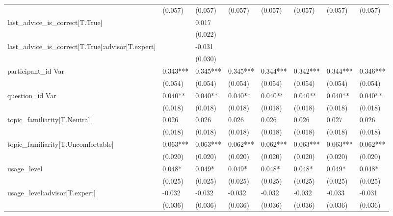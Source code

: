 \begin{table}
\begin{center}
\begin{tabular}{llllllll}
                                                    & (0.057)  & (0.057)  & (0.057)  & (0.057)  & (0.057)  & (0.057)  & (0.057)   \\
last\_advice\_is\_correct[T.True]                   &          & 0.017    &          &          &          &          &           \\
                                                    &          & (0.022)  &          &          &          &          &           \\
last\_advice\_is\_correct[T.True]:advisor[T.expert] &          & -0.031   &          &          &          &          &           \\
                                                    &          & (0.030)  &          &          &          &          &           \\
participant\_id Var                                 & 0.343*** & 0.345*** & 0.345*** & 0.344*** & 0.342*** & 0.344*** & 0.346***  \\
                                                    & (0.054)  & (0.054)  & (0.054)  & (0.054)  & (0.054)  & (0.054)  & (0.054)   \\
question\_id Var                                    & 0.040**  & 0.040**  & 0.040**  & 0.040**  & 0.040**  & 0.040**  & 0.040**   \\
                                                    & (0.018)  & (0.018)  & (0.018)  & (0.018)  & (0.018)  & (0.018)  & (0.018)   \\
topic\_familiarity[T.Neutral]                       & 0.026    & 0.026    & 0.026    & 0.026    & 0.026    & 0.027    & 0.026     \\
                                                    & (0.018)  & (0.018)  & (0.018)  & (0.018)  & (0.018)  & (0.018)  & (0.018)   \\
topic\_familiarity[T.Uncomfortable]                 & 0.063*** & 0.063*** & 0.062*** & 0.062*** & 0.063*** & 0.063*** & 0.062***  \\
                                                    & (0.020)  & (0.020)  & (0.020)  & (0.020)  & (0.020)  & (0.020)  & (0.020)   \\
usage\_level                                        & 0.048*   & 0.049*   & 0.049*   & 0.048*   & 0.048*   & 0.049*   & 0.048*    \\
                                                    & (0.025)  & (0.025)  & (0.025)  & (0.025)  & (0.025)  & (0.025)  & (0.025)   \\
usage\_level:advisor[T.expert]                      & -0.032   & -0.032   & -0.032   & -0.032   & -0.032   & -0.033   & -0.031    \\
                                                    & (0.036)  & (0.036)  & (0.036)  & (0.036)  & (0.036)  & (0.036)  & (0.036)   \\
\hline
\end{tabular}
\end{center}
\end{table}